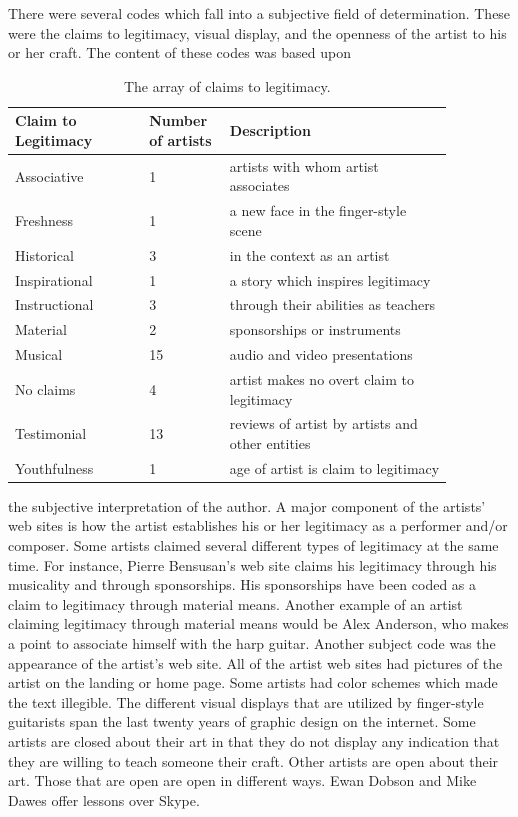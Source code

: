 \documentclass[unicode,hyperfootnotes=false,xetex,colorlinks=true,nofonts,nobib]{tufte-handout}
\begin{document}
There were several codes which fall into a subjective field of determination. These were the claims to legitimacy, visual display, and the openness of the artist to his or her craft. The content of these codes was based upon
\begin{table}
  \centering
  \small
  \begin{tabular}{p{0.27\linewidth}p{0.15\linewidth}p{0.45\linewidth}}\toprule
    Claim to Legitimacy & Number of artists & Description \\\midrule
    Associative & 1 & artists with whom artist associates \\
    Freshness & 1 & a new face in the finger-style scene \\
    Historical & 3 & in the context as an artist \\
    Inspirational & 1 & a story which inspires legitimacy \\
    Instructional & 3 & through their abilities as teachers \\
    Material & 2 & sponsorships or instruments \\
    Musical & 15 & audio and video presentations \\
    No claims & 4 & artist makes no overt claim to legitimacy \\
    Testimonial & 13 & reviews of artist by artists and other entities \\
    Youthfulness & 1 & age of artist is claim to legitimacy \\
      \bottomrule
  \end{tabular}
  \caption{The array of claims to legitimacy.}
\end{table}
the subjective interpretation of the author. A major component of the artists' web sites is how the artist establishes his or her legitimacy as a performer and/or composer. Some artists claimed several different types of legitimacy at the same time. For instance, Pierre Bensusan's web site claims his legitimacy through his musicality and through sponsorships. His sponsorships have been coded as a claim to legitimacy through material means. Another example of an artist claiming legitimacy through material means would be Alex Anderson, who makes a point to associate himself with the harp guitar. Another subject code was the appearance of the artist's web site. All of the artist web sites had pictures of the artist on the landing or home page. Some artists had color schemes which made the text illegible. The different visual displays that are utilized by finger-style guitarists span the last twenty years of graphic design on the internet. Some artists are closed about their art in that they do not display any indication that they are willing to teach someone their craft. Other artists are open about their art. Those that are open are open in different ways. Ewan Dobson and Mike Dawes offer lessons over Skype.
\end{document}
